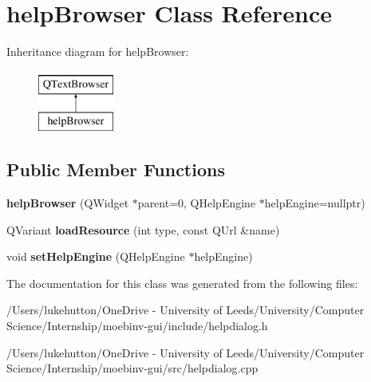 \hypertarget{classhelp_browser}{}\section{help\+Browser Class Reference}
\label{classhelp_browser}
Inheritance diagram for help\+Browser\+:\begin{figure}[H]
\begin{center}
\leavevmode
\includegraphics[height=2.000000cm]{classhelp_browser}
\end{center}
\end{figure}
\subsection*{Public Member Functions}
\begin{DoxyCompactItemize}
\item 
\mbox{\label{classhelp_browser_a0c24d5dbf041a323695a9260c1f4d774}} 
{\bfseries help\+Browser} (Q\+Widget $\ast$parent=0, Q\+Help\+Engine $\ast$help\+Engine=nullptr)
\item 
\mbox{\label{classhelp_browser_a92edbf57806761e03457bf941587c2a8}} 
Q\+Variant {\bfseries load\+Resource} (int type, const Q\+Url \&name)
\item 
\mbox{\label{classhelp_browser_a2ecdeeeeca618d3436adeec6d782f621}} 
void {\bfseries set\+Help\+Engine} (Q\+Help\+Engine $\ast$help\+Engine)
\end{DoxyCompactItemize}


The documentation for this class was generated from the following files\+:\begin{DoxyCompactItemize}
\item 
/\+Users/lukehutton/\+One\+Drive -\/ University of Leeds/\+University/\+Computer Science/\+Internship/moebinv-\/gui/include/helpdialog.\+h\item 
/\+Users/lukehutton/\+One\+Drive -\/ University of Leeds/\+University/\+Computer Science/\+Internship/moebinv-\/gui/src/helpdialog.\+cpp\end{DoxyCompactItemize}
